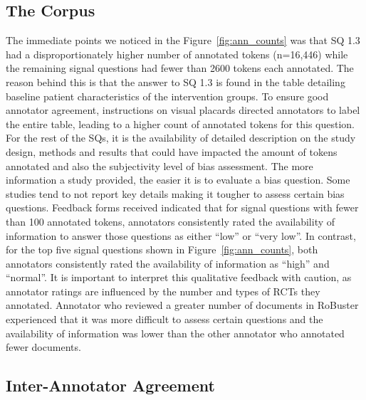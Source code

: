 \documentclass[sn-mathphys,Numbered]{sn-jnl}%
\theoremstyle{thmstyleone}%
\theoremstyle{thmstyletwo}%
\theoremstyle{thmstylethree}%
\begin{document}
%
%
%
%
%
\subsection{The Corpus}
\label{disc:corpus}
%
The immediate points we noticed in the Figure~\ref{fig:ann_counts} was that SQ 1.3 had a disproportionately higher number of annotated tokens (n=16,446) while the remaining signal questions had fewer than 2600 tokens each annotated.
The reason behind this is that the answer to SQ 1.3 is found in the table detailing baseline patient characteristics of the intervention groups.
To ensure good annotator agreement, instructions on visual placards directed annotators to label the entire table, leading to a higher count of annotated tokens for this question.
For the rest of the SQs, it is the availability of detailed description on the study design, methods and results that could have impacted the amount of tokens annotated and also the subjectivity level of bias assessment.
The more information a study provided, the easier it is to evaluate a bias question.
Some studies tend to not report key details making it tougher to assess certain bias questions.
Feedback forms received indicated that for signal questions with fewer than 100 annotated tokens, annotators consistently rated the availability of information to answer those questions as either ``low'' or ``very low''.
In contrast, for the top five signal questions shown in Figure~\ref{fig:ann_counts}, both annotators consistently rated the availability of information as ``high'' and ``normal''.
It is important to interpret this qualitative feedback with caution, as annotator ratings are influenced by the number and types of RCTs they annotated.
Annotator who reviewed a greater number of documents in RoBuster experienced that it was more difficult to assess certain questions and the availability of information was lower than the other annotator who annotated fewer documents.
%
%
%
\subsection{Inter-Annotator Agreement}
\label{disc:iaa}
%
\end{document}

